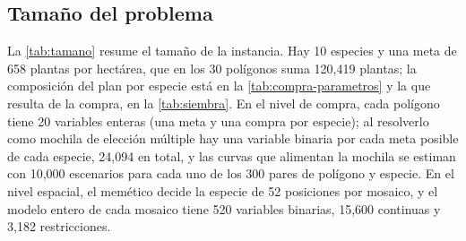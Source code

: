 \subsection{Tamaño del problema}
\label{subsec:tamano}

La \cref{tab:tamano} resume el tamaño de la instancia. Hay 10 especies y una meta de 658 plantas por hectárea, que en los 30 polígonos suma 120{,}419 plantas; la composición del plan por especie está en la \cref{tab:compra-parametros} y la que resulta de la compra, en la \cref{tab:siembra}. En el nivel de compra, cada polígono tiene 20 variables enteras (una meta y una compra por especie); al resolverlo como mochila de elección múltiple hay una variable binaria por cada meta posible de cada especie, 24{,}094 en total, y las curvas que alimentan la mochila se estiman con 10{,}000 escenarios para cada uno de los 300 pares de polígono y especie. En el nivel espacial, el memético decide la especie de 52 posiciones por mosaico, y el modelo entero de cada mosaico tiene 520 variables binarias, 15{,}600 continuas y 3{,}182 restricciones.

